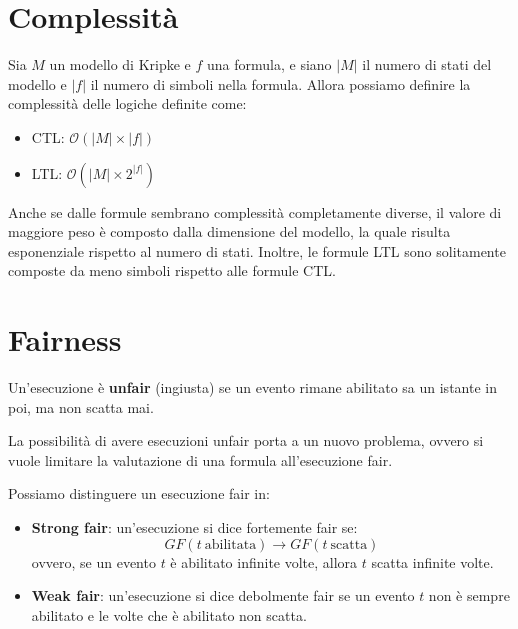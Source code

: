 \section{Complessità}
Sia $M$ un modello di Kripke e $f$ una formula, e siano $|M|$ il numero di stati
del modello e $|f|$ il numero di simboli nella formula. Allora possiamo definire
la complessità delle logiche definite come:
\begin{itemize}
    \item CTL: $\mathcal{O}(|M| \times |f|)$
    \item LTL: $\mathcal{O}(|M| \times 2^{|f|})$
\end{itemize}
Anche se dalle formule sembrano complessità completamente diverse, il valore di
maggiore peso è composto dalla dimensione del modello, la quale risulta
esponenziale rispetto al numero di stati. Inoltre, le formule LTL sono solitamente
composte da meno simboli rispetto alle formule CTL.
\section{Fairness}
\begin{definizione}
    Un'esecuzione è \textbf{unfair} (ingiusta) se un evento rimane abilitato sa
    un istante in poi, ma non scatta mai.
\end{definizione}
La possibilità di avere esecuzioni unfair porta a un nuovo problema, ovvero si
vuole limitare la valutazione di una formula all'esecuzione fair.

Possiamo distinguere un esecuzione fair in:
\begin{itemize}
    \item \textbf{Strong fair}: un'esecuzione si dice fortemente fair se:
          \begin{equation}
              GF(t \ \text{abilitata}) \to GF(t \ \text{scatta})
          \end{equation}
          ovvero, se un evento $t$ è abilitato infinite volte, allora $t$ scatta
          infinite volte.
    \item \textbf{Weak fair}: un'esecuzione si dice debolmente fair se un evento
          $t$ non è sempre abilitato e le volte che è abilitato non scatta.
\end{itemize}